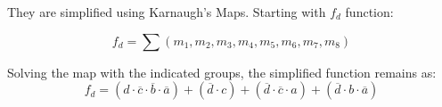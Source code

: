         They are simplified using Karnaugh's Maps. Starting with $f_d$ function:\par
        \[
            f_{d}=\sum{(m_1,m_2,m_3,m_4,m_5,m_6,m_7,m_8)}
        \]
        \begin{centering}
            \begin{Karnaugh}
            \end{Karnaugh}
        \par\end{centering}
        Solving the map with the indicated groups, the simplified 
        function remains as:
        \[
            \boxed{f_{d}=(d \cdot \overline{c} \cdot \overline{b} \cdot \overline{a})+
            (\overline{d} \cdot c)+(\overline{d} \cdot \overline{c} \cdot a)+
            (\overline{d} \cdot b \cdot \overline{a})}    
        \]
     

